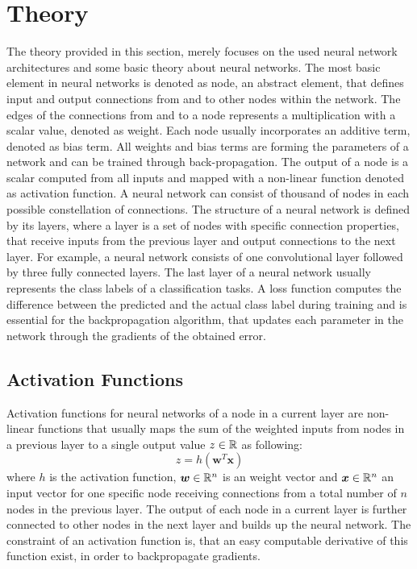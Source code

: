 
\section{Theory}\label{sec:nn_theory}
\thesisStateRevised
\thesisStateNew
The theory provided in this section, merely focuses on the used neural network architectures and some basic theory about neural networks.
The most basic element in neural networks is denoted as node, an abstract element, that defines input and output connections from and to other nodes within the network.
The edges of the connections from and to a node represents a multiplication with a scalar value, denoted as weight.
Each node usually incorporates an additive term, denoted as bias term.
All weights and bias terms are forming the parameters of a network and can be trained through back-propagation.
The output of a node is a scalar computed from all inputs and mapped with a non-linear function denoted as activation function.
A neural network can consist of thousand of nodes in each possible constellation of connections.
The structure of a neural network is defined by its layers, where a layer is a set of nodes with specific connection properties, that receive inputs from the previous layer and output connections to the next layer.
For example, a neural network consists of one convolutional layer followed by three fully connected layers.
The last layer of a neural network usually represents the class labels of a classification tasks.
A loss function computes the difference between the predicted and the actual class label during training and is essential for the backpropagation algorithm, that updates each parameter in the network through the gradients of the obtained error.



\subsection{Activation Functions}\label{sec:nn_theory_acti}
Activation functions for neural networks of a node in a current layer are non-linear functions that usually maps the sum of the weighted inputs from nodes in a previous layer to a single output value $z \in \mathbb{R}$ as following:
\begin{equation}\label{eq:nn_theory_acti}
  z = h(\bm{w}^T \bm{x})
\end{equation}
where $h$ is the activation function, $\bm{w} \in \mathbb{R}^n$ is an weight vector and $\bm{x} \in \mathbb{R}^n$ an input vector for one specific node receiving connections from a total number of $n$ nodes in the previous layer.
The output of each node in a current layer is further connected to other nodes in the next layer and builds up the neural network.
The constraint of an activation function is, that an easy computable derivative of this function exist, in order to backpropagate gradients.

